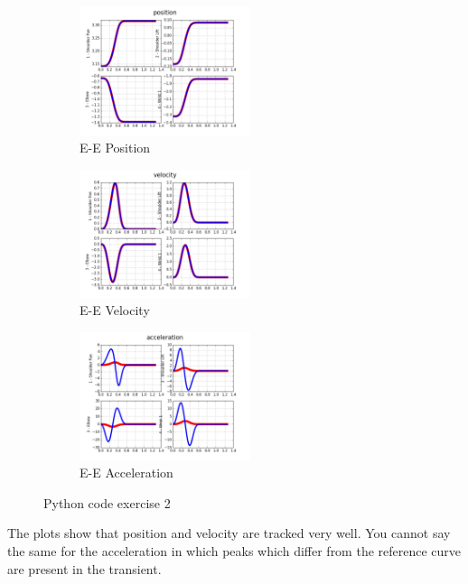 \documentclass[11pt,a4paper]{article}
\begin{document}
\begin{figure}[H]
	\begin{subfigure}[b]{0.33\textwidth}
		\centering
		\includegraphics[width=50mm]{images/pos.JPEG}
		\caption{E-E Position}
	\end{subfigure}
	\begin{subfigure}[b]{0.33\textwidth}
		\centering
		\includegraphics[width=50mm]{images/vel.JPEG}
		\caption{E-E Velocity}
	\end{subfigure}
	\begin{subfigure}[b]{0.33\textwidth}
		\centering
		\includegraphics[width=50mm]{images/acc.JPEG}
		\caption{E-E Acceleration}
	\end{subfigure}
	\caption{Python code exercise 2}
	\label{codici}
\end{figure}
The plots show that position and velocity are tracked very well. You cannot say the same for the acceleration in which peaks which differ from the reference curve are present in the transient.  
\end{document}
